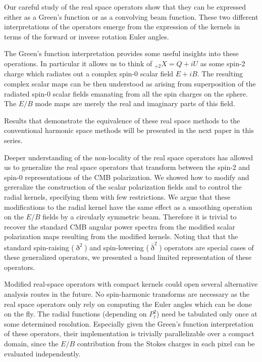 Our careful study of the real space operators show that they can be expressed either as a Green's function or as a convolving beam function.   These two different interpretations of the operators emerge from the expression of the kernels in terms of the forward or inverse rotation Euler angles.  

The Green's function interpretation provides some useful insights into these operations. In particular it allows us to think of ${}_{+2}X=Q+iU$ as some spin-2 charge which radiates out a complex spin-0 scalar field $E+iB$. The resulting complex scalar maps can be then understood as arising from superposition of the radiated spin-0 scalar fields emanating from all the spin charges on the sphere.  The $E/B$ mode maps are merely the real and imaginary parts of this field.


Results that demonstrate the equivalence of these real space methods to the conventional harmonic space methods will be presented in the next paper in this series.

Deeper understanding of the non-locality of the real space operators has allowed us to generalize the real space operators that transform between the spin-2 and spin-0 representations of the CMB polarization. We showed how to modify and gereralize the construction of the scalar polarization fields and to control the radial kernels, specifying them with few restrictions.  We argue that these modifications to the radial kernel have the same effect as a smoothing operation on the $E/B$ fields by a circularly symmetric beam.  Therefore it is trivial to recover the standard CMB angular power spectra from the modified scalar polarization maps resulting from the modified kernels.  Noting that that the standard spin-raising ($\eth^2$) and spin-lowering ($\bar{\eth}^2$) operators are special cases of these generalized operators, we presented a band limited representation of these operators. 



Modified real-space operators with compact kernels could open several alternative analysis routes in the future.  No spin-harmonic transforms are necessary as the real space operators only rely on computing the Euler angles which can be done on the fly.  The radial functions (depending on $P_{\ell}^{2}$) need be tabulated only once at some determined resolution.  Especially given the Green's function interpretation of these operators, their implementation is trivially parallelizable over a compact domain, since the $E/B$ contribution from the Stokes charges in each pixel can be evaluated independently.  

